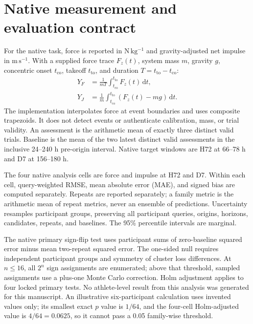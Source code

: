 \documentclass[10pt,a4paper]{article}
\begin{document}
\section{Native measurement and evaluation contract}

For the native task, force is reported in \(\mathrm{N\,kg^{-1}}\) and gravity-adjusted net impulse in \(\mathrm{m\,s^{-1}}\). With a supplied force trace \(F_z(t)\), system mass \(m\), gravity \(g\), concentric onset \(t_{\mathrm{co}}\), takeoff \(t_{\mathrm{to}}\), and duration \(T=t_{\mathrm{to}}-t_{\mathrm{co}}\):
\begin{align}
Y_F &= \frac{1}{mT}\int_{t_{\mathrm{co}}}^{t_{\mathrm{to}}}F_z(t)\,\mathrm{d}t,\\
Y_J &= \frac{1}{m}\int_{t_{\mathrm{co}}}^{t_{\mathrm{to}}}\left(F_z(t)-mg\right)\,\mathrm{d}t.
\end{align}
The implementation interpolates force at event boundaries and uses composite trapezoids. It does not detect events or authenticate calibration, mass, or trial validity. An assessment is the arithmetic mean of exactly three distinct valid trials. Baseline is the mean of the two latest distinct valid assessments in the inclusive 24--240 h pre-origin interval. Native target windows are H72 at 66--78 h and D7 at 156--180 h.

The four native analysis cells are force and impulse at H72 and D7. Within each cell, query-weighted RMSE, mean absolute error (MAE), and signed bias are computed separately. Repeats are reported separately; a family metric is the arithmetic mean of repeat metrics, never an ensemble of predictions. Uncertainty resamples participant groups, preserving all participant queries, origins, horizons, candidates, repeats, and baselines. The 95\% percentile intervals are marginal.

The native primary sign-flip test uses participant sums of zero-baseline squared error minus mean two-repeat squared error. The one-sided null requires independent participant groups and symmetry of cluster loss differences. At \(n\leq16\), all \(2^n\) sign assignments are enumerated; above that threshold, sampled assignments use a plus-one Monte Carlo correction. Holm adjustment applies to four locked primary tests. No athlete-level result from this analysis was generated for this manuscript. An illustrative six-participant calculation uses invented values only; its smallest exact \(p\) value is \(1/64\), and the four-cell Holm-adjusted value is \(4/64=0.0625\), so it cannot pass a 0.05 family-wise threshold.
\end{document}

